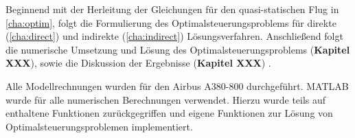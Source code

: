 Beginnend mit der Herleitung der Gleichungen für den quasi-statischen Flug in \autoref{cha:optim}, folgt die Formulierung des Optimalsteuerungsproblems für direkte (\autoref{cha:direct}) und indirekte (\autoref{cha:indirect}) Lösungsverfahren. Anschließend folgt die numerische Umsetzung und Lösung des Optimalsteuerungsproblems (\textbf{Kapitel XXX}), sowie die Diskussion der Ergebnisse (\textbf{Kapitel XXX}) .

Alle Modellrechnungen wurden für den Airbus A380-800 \cite{A380Tech} durchgeführt. MATLAB wurde für alle numerischen Berechnungen verwendet. Hierzu wurde teils auf enthaltene Funktionen zurückgegriffen und eigene Funktionen zur Lösung von Optimalsteuerungsproblemen implementiert.




